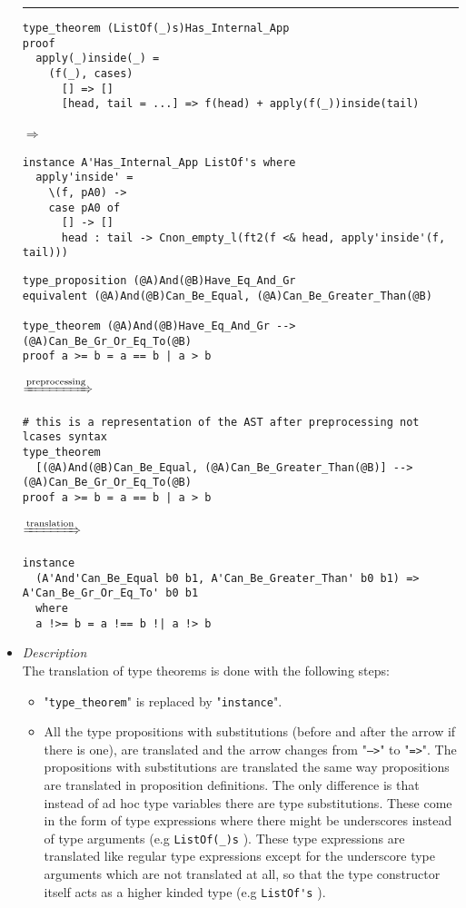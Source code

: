 \documentclass{article}
\def\lra{$\Longrightarrow$\ }
\def\prarr{$\xRightarrow{\text{preprocessing}}$\ }
\begin{document}
\begin{itemize}
\rule{\linewidth}{0.1pt}

\begin{verbatim}
type_theorem (ListOf(_)s)Has_Internal_App
proof
  apply(_)inside(_) =
    (f(_), cases)
      [] => []
      [head, tail = ...] => f(head) + apply(f(_))inside(tail)
\end{verbatim}

\lra

\begin{verbatim}
instance A'Has_Internal_App ListOf's where
  apply'inside' =
    \(f, pA0) ->
    case pA0 of
      [] -> []
      head : tail -> Cnon_empty_l(ft2(f <& head, apply'inside'(f, tail)))

\end{verbatim}

\newpage

\begin{verbatim}
type_proposition (@A)And(@B)Have_Eq_And_Gr
equivalent (@A)And(@B)Can_Be_Equal, (@A)Can_Be_Greater_Than(@B)

type_theorem (@A)And(@B)Have_Eq_And_Gr --> (@A)Can_Be_Gr_Or_Eq_To(@B)
proof a >= b = a == b | a > b
\end{verbatim}
\prarr
\begin{verbatim}
# this is a representation of the AST after preprocessing not lcases syntax
type_theorem
  [(@A)And(@B)Can_Be_Equal, (@A)Can_Be_Greater_Than(@B)] --> (@A)Can_Be_Gr_Or_Eq_To(@B)
proof a >= b = a == b | a > b
\end{verbatim}
$\xRightarrow{\text{translation}}$
\begin{verbatim}
instance
  (A'And'Can_Be_Equal b0 b1, A'Can_Be_Greater_Than' b0 b1) => A'Can_Be_Gr_Or_Eq_To' b0 b1
  where
  a !>= b = a !== b !| a !> b
\end{verbatim}

\item
\textit{Description} \\

The translation of type theorems is done with the following steps:

\begin{itemize}

\item
"\texttt{type_theorem}" is replaced by "\texttt{instance}".

\item
All the type propositions with substitutions (before and after the arrow if
there is one), are translated and the arrow changes from "\texttt{-->}" to
"\texttt{=>}". The propositions with substitutions are translated the same way
propositions are translated in proposition definitions. The only difference is
that instead of ad hoc type variables there are type substitutions. These come
in the form of type expressions where there might be underscores instead of
type arguments (e.g \verb|ListOf(_)s| ). These type expressions are translated
like regular type expressions except for the underscore type arguments which
are not translated at all, so that the type constructor itself acts as a higher
kinded type (e.g \verb|ListOf's| ).


\end{itemize}
\end{itemize}
\end{document}
